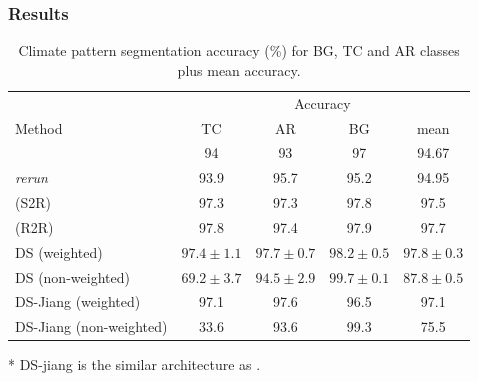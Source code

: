 \documentclass{article} %
\begin{document}
\subsubsection*{Results}
\begin{table}[!ht]
\begin{tabular}{l|c c c c}
        \multicolumn{1}{l}{} & \multicolumn{4}{c}{Accuracy}\\
        \cmidrule(lr){2-5}
        \multicolumn{1}{l}{Method} & TC & AR & BG & mean \\ \hline
        \cite{jiang_spherical_2019} & 94 & 93 & 97 & 94.67\\
        \cite{jiang_spherical_2019} \emph{rerun} & 93.9 & 95.7 & 95.2 & 94.95\\
        \cite{cohen_gauge_2019} (S2R) & 97.3 & 97.3 & 97.8 & 97.5\\
        \cite{cohen_gauge_2019} (R2R) & 97.8 & 97.4 & 97.9 & 97.7\\ \hline
        DS (weighted) & $97.4\pm 1.1$ & $97.7\pm 0.7$ & $98.2\pm 0.5$ & $97.8\pm 0.3$ \\
        DS (non-weighted) & $69.2\pm 3.7$ & $94.5\pm 2.9$ & $99.7\pm 0.1$ & $87.8\pm 0.5$ \\ \hline
        DS-Jiang (weighted) & 97.1 & 97.6 & 96.5 & 97.1\\
        DS-Jiang (non-weighted) & 33.6 & 93.6 & 99.3 & 75.5
    \end{tabular}
    \caption{Climate pattern segmentation accuracy (\%) for BG, TC
and AR classes plus mean accuracy.}
\end{table}

* DS-jiang is the similar architecture as \cite{jiang_spherical_2019}.\\
\end{document}
